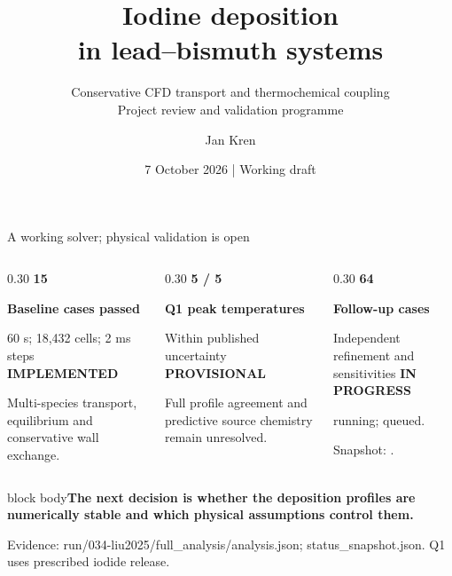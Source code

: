 \documentclass[aspectratio=169,10pt]{beamer}
\title{Iodine deposition\\in lead--bismuth systems}
\subtitle{Conservative CFD transport and thermochemical coupling\\Project review and validation programme}
\author{Jan Kren}
\institute{Villigen PSI}
\date{7 October 2026 \enspace | \enspace Working draft}
\newcommand{\sources}[1]{\par\vfill{\raggedright\fontsize{6.2}{7.5}\selectfont\color{PSIgray}#1\par}}
\newcommand{\takeaway}[1]{\par\vspace{0.2em}\begin{beamercolorbox}[sep=0.4em,wd=\linewidth]{block body}{\small\textbf{#1}}\end{beamercolorbox}}
\newcommand{\statuslabel}[2]{\textcolor{#1}{\textbf{#2}}}
\newcommand{\metric}[3]{\textcolor{PSIblue}{\fontsize{27}{31}\selectfont\textbf{#1}}\par\vspace{0.25em}\textbf{#2}\par{\small #3}}
\begin{document}
{
\begin{frame}[plain]
  \titlepage
\end{frame}}

\begin{frame}[t]{A working solver; physical validation is open}
  \begin{columns}[t,onlytextwidth]
    \begin{column}{0.30\textwidth}
      \metric{15}{Baseline cases passed}{60 s; 18,432 cells; 2 ms steps}
      \vspace{0.8em}
      \statuslabel{PSIblue}{IMPLEMENTED}\par
      \small Multi-species transport, equilibrium and conservative wall exchange.
    \end{column}
    \begin{column}{0.30\textwidth}
      \metric{5 / 5}{Q1 peak temperatures}{Within published uncertainty}
      \vspace{0.8em}
      \statuslabel{PSIred}{PROVISIONAL}\par
      \small Full profile agreement and predictive source chemistry remain unresolved.
    \end{column}
    \begin{column}{0.30\textwidth}
      \metric{64}{Follow-up cases}{Independent refinement and sensitivities}
      \vspace{0.8em}
      \statuslabel{PSIpurple}{IN PROGRESS}\par
      \small \RunningCases{} running; \QueuedCases{} queued.\par
      \small Snapshot: \SnapshotTime.
    \end{column}
  \end{columns}
  \takeaway{The next decision is whether the deposition profiles are numerically stable and which physical assumptions control them.}
  \sources{Evidence: run/034-liu2025/full\_analysis/analysis.json; status\_snapshot.json. Q1 uses prescribed iodide release.}
\end{frame}
\end{document}
